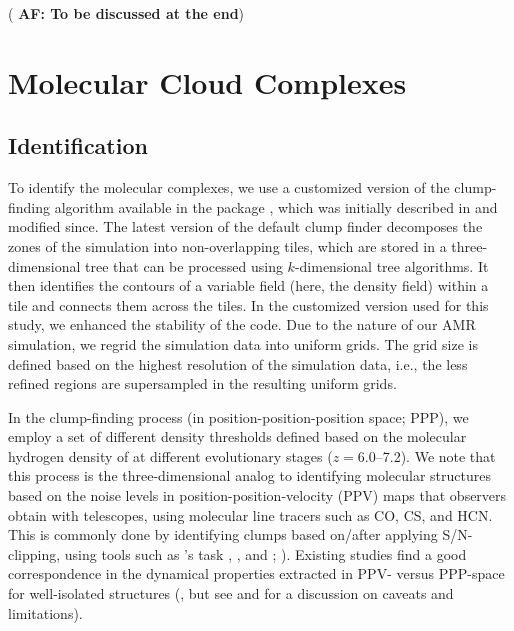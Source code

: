 \IfFileExists{emulateapjlegacy.cls}{\documentclass[iop]{emulateapjlegacy}}{\documentclass[iop]{emulateapj}}
\newcommand{\AF}[1]{({\bf \color{afcolor} AF: #1})}
\begin{document}
\AF{To be discussed at the end}

\section{Molecular Cloud Complexes}\label{sec:eqn}

\subsection{Identification}\label{sec:method}

To identify the molecular complexes, we use a customized version of the clump-finding algorithm available in the  package  \citep{Turk11a}, which was initially described in \citet{Smith09a} and modified since.
%
The latest version of the default  clump finder decomposes the zones of the simulation into non-overlapping tiles, which are stored in a three-dimensional tree that can be processed using $k$-dimensional tree algorithms. It then identifies the contours of a variable field (here, the density field) within a tile and connects them across the tiles. In the customized version used for this study, we enhanced the stability of the code.
%
Due to the nature of our AMR simulation, we regrid the simulation data into uniform grids. The grid size is defined based on the highest resolution of the simulation data, i.e., the less refined regions are supersampled in the resulting uniform grids.

In the clump-finding process (in position-position-position space; PPP), we employ a set of different density thresholds defined based on the molecular hydrogen density of \flower at different evolutionary stages ($z=6.0$--7.2).
%
We note that this process is the three-dimensional analog to identifying molecular structures based on the noise levels in position-position-velocity (PPV) maps that observers obtain with telescopes, using molecular line tracers such as CO, CS, and HCN. This is commonly done by
identifying clumps based on/after applying S/N-clipping, using tools such as 's task , , and ; \citealt{Williams94a, Oka01a, Rosolowsky06a, Rosolowsky08a}).
%
Existing studies find a good correspondence in the dynamical properties extracted in PPV- versus PPP-space for well-isolated structures (\citealt{Ballesteros-Paredes02a, Heitsch09a, Shetty10a, Beaumont13a, Pan15a}, but see \citealt{Ballesteros-Paredes02a} and \citealt{Shetty10a} for a discussion on caveats and limitations).
\end{document}
